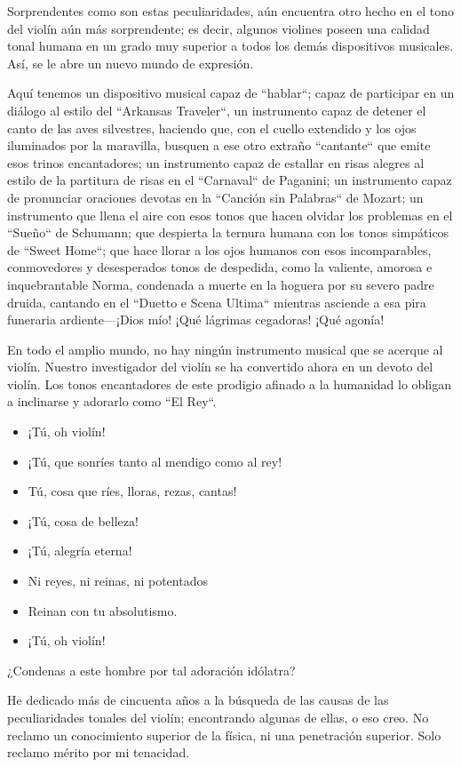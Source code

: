 Sorprendentes como son estas peculiaridades, aún encuentra otro hecho en el tono del violín aún más sorprendente; es decir, algunos violines poseen una calidad tonal humana en un grado muy superior a todos los demás dispositivos musicales. Así, se le abre un nuevo mundo de expresión.

Aquí tenemos un dispositivo musical capaz de ``hablar``; capaz de participar en un diálogo al estilo del ``Arkansas Traveler``, un instrumento capaz de detener el canto de las aves silvestres, haciendo que, con el cuello extendido y los ojos iluminados por la maravilla, busquen a ese otro extraño ``cantante`` que emite esos trinos encantadores; un instrumento capaz de estallar en risas alegres al estilo de la partitura de risas en el ``Carnaval`` de Paganini; un instrumento capaz de pronunciar oraciones devotas en la ``Canción sin Palabras`` de Mozart; un instrumento que llena el aire con esos tonos que hacen olvidar los problemas en el ``Sueño`` de Schumann; que despierta la ternura humana con los tonos simpáticos de ``Sweet Home``; que hace llorar a los ojos humanos con esos incomparables, conmovedores y desesperados tonos de despedida, como la valiente, amorosa e inquebrantable Norma, condenada a muerte en la hoguera por su severo padre druida, cantando en el ``Duetto e Scena Ultima`` mientras asciende a esa pira funeraria ardiente—¡Dios mío! ¡Qué lágrimas cegadoras! ¡Qué agonía!

En todo el amplio mundo, no hay ningún instrumento musical que se acerque al violín. Nuestro investigador del violín se ha convertido ahora en un devoto del violín. Los tonos encantadores de este prodigio afinado a la humanidad lo obligan a inclinarse y adorarlo como ``El Rey``.
\begin{itemize}
 \item ¡Tú, oh violín!
 \item ¡Tú, que sonríes tanto al mendigo como al rey!
 \item Tú, cosa que ríes, lloras, rezas, cantas!
 \item ¡Tú, cosa de belleza!
 \item ¡Tú, alegría eterna!
 \item Ni reyes, ni reinas, ni potentados
 \item Reinan con tu absolutismo.
 \item ¡Tú, oh violín!
\end{itemize}
¿Condenas a este hombre por tal adoración idólatra?

He dedicado más de cincuenta años a la búsqueda de las causas de las peculiaridades tonales del violín; encontrando algunas de ellas, o eso creo. No reclamo un conocimiento superior de la física, ni una penetración superior. Solo reclamo mérito por mi tenacidad.

